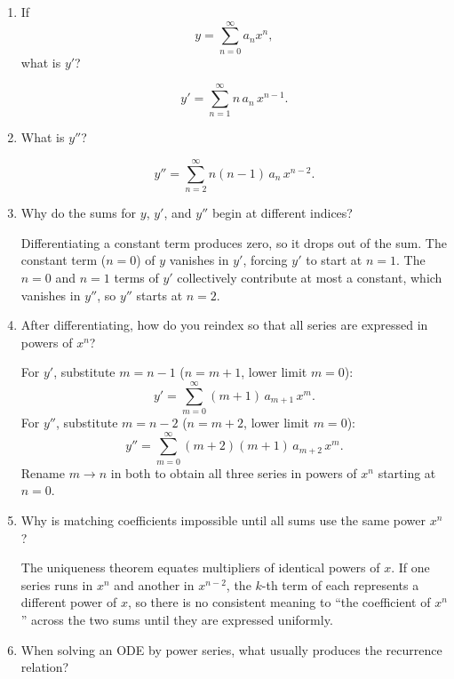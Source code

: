 \documentclass{self-check}
\begin{document}
\begin{enumerate}[leftmargin=*, itemsep=8pt]
    \begin{answer}
      Then \(a_{0}, a_{1}, a_{2}, a_{3}, a_{4}\) would each be forced to zero individually (isolated terms), and for \(n \ge 5\) one would obtain \(a_{n} + b_{n} = 0\).
    \end{answer}
  \item If
    \[ y=\sum_{n=0}^{\infty}a_{n} x^{n}, \]
    what is \(y'\)?
    \begin{answer}
      \[ y' = \sum_{n=1}^{\infty}n\, a_{n}\, x^{n-1}. \]
    \end{answer}
  \item What is \(y''\)?
    \begin{answer}
      \[ y'' = \sum_{n=2}^{\infty}n(n-1)\, a_{n}\, x^{n-2}. \]
    \end{answer}
  \item Why do the sums for \(y\), \(y'\), and \(y''\) begin at different indices?
    \begin{answer}
      Differentiating a constant term produces zero, so it drops out of the sum. The constant term (\(n=0\)) of \(y\) vanishes in \(y'\), forcing \(y'\) to start at \(n=1\). The \(n=0\) and \(n=1\) terms of \(y'\) collectively contribute at most a constant, which vanishes in \(y''\), so \(y''\) starts at \(n=2\).
    \end{answer}
  \item After differentiating, how do you reindex so that all series are expressed in powers of \(x^{n}\)?
    \begin{answer}
      For \(y'\), substitute \(m = n-1\) (\(n = m+1\), lower limit \(m=0\)):
      \[ y' = \sum_{m=0}^{\infty}(m+1)\,a_{m+1}\,x^{m}. \]
      For \(y''\), substitute \(m = n-2\) (\(n = m+2\), lower limit \(m=0\)):
      \[ y'' = \sum_{m=0}^{\infty}(m+2)(m+1)\,a_{m+2}\,x^{m}. \]
      Rename \(m \to n\) in both to obtain all three series in powers of \(x^{n}\) starting at \(n=0\).
    \end{answer}
  \item Why is matching coefficients impossible until all sums use the same power \(x^{n}\)?
    \begin{answer}
      The uniqueness theorem equates multipliers of identical powers of \(x\). If one series runs in \(x^{n}\) and another in \(x^{n-2}\), the \(k\)-th term of each represents a different power of \(x\), so there is no consistent meaning to ``the coefficient of \(x^{n}\)'' across the two sums until they are expressed uniformly.
    \end{answer}
  \item When solving an ODE by power series, what usually produces the recurrence relation?

\end{enumerate}
\end{document}

